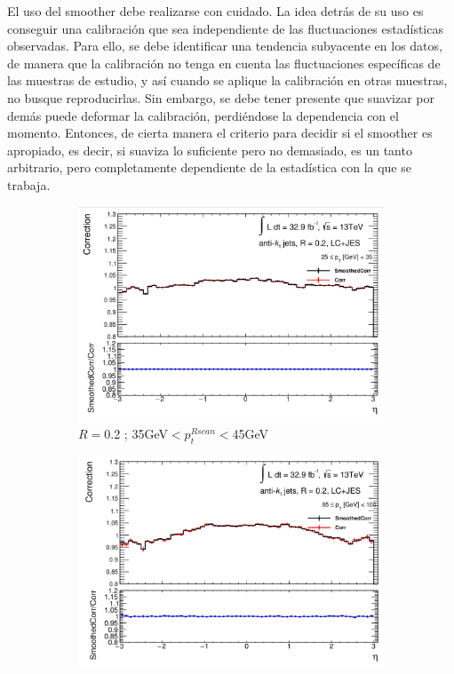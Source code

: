 El uso del smoother debe realizarse con cuidado. La idea detrás de su uso es conseguir una calibración que sea independiente de las fluctuaciones estadísticas observadas. Para ello, se debe identificar una tendencia subyacente en los datos, de manera que la calibración no tenga en cuenta las fluctuaciones específicas de las muestras de estudio, y así cuando se aplique la calibración en otras muestras, no busque reproducirlas. Sin embargo, se debe tener presente que suavizar por demás puede deformar la calibración, perdiéndose la dependencia con el momento. Entonces, de cierta manera el criterio para decidir si el smoother es apropiado, es decir, si suaviza lo suficiente pero no demasiado, es un tanto arbitrario, pero completamente dependiente de la estadística con la que se trabaja. 

\begin{figure}[ht]
    \centering
    \begin{subfigure}[b]{0.495\textwidth}
        \centering
        \includegraphics[width=\textwidth]{images/Smo_2LC_ETA_1.png}
        \caption{$R=$0.2 ; 35GeV$<p_t^{Rscan}<$45GeV}
    \end{subfigure}
    \hfill
    \begin{subfigure}[b]{0.495\textwidth}
        \centering
        \includegraphics[width=\textwidth]{images/Smo_2LC_ETA_2.png}

\end{subfigure}
\end{figure}
